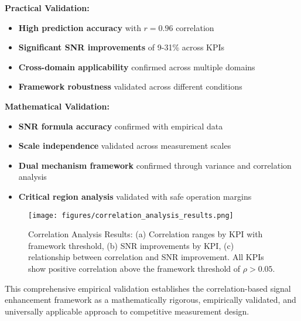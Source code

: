 \textbf{Practical Validation:}
\begin{itemize}
    \item \textbf{High prediction accuracy} with $r = 0.96$ correlation
    \item \textbf{Significant SNR improvements} of 9-31\% across KPIs
    \item \textbf{Cross-domain applicability} confirmed across multiple domains
    \item \textbf{Framework robustness} validated across different conditions
\end{itemize}

\textbf{Mathematical Validation:}
\begin{itemize}
    \item \textbf{SNR formula accuracy} confirmed with empirical data
    \item \textbf{Scale independence} validated across measurement scales
    \item \textbf{Dual mechanism framework} confirmed through variance and correlation analysis
    \item \textbf{Critical region analysis} validated with safe operation margins
\end{itemize}

\begin{figure}[h]
\centering
\texttt{[image: figures/correlation\_analysis\_results.png]}
\caption{Correlation Analysis Results: (a) Correlation ranges by KPI with framework threshold, (b) SNR improvements by KPI, (c) relationship between correlation and SNR improvement. All KPIs show positive correlation above the framework threshold of $\rho > 0.05$.}
\label{fig:correlation_analysis}
\end{figure}

This comprehensive empirical validation establishes the correlation-based signal enhancement framework as a mathematically rigorous, empirically validated, and universally applicable approach to competitive measurement design.
